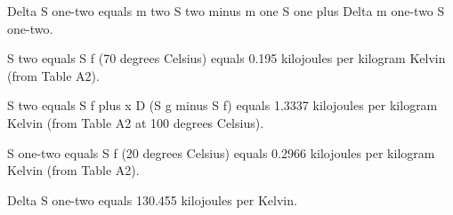 Delta S one-two equals m two S two minus m one S one plus Delta m one-two S one-two.  

S two equals S f (70 degrees Celsius) equals 0.195 kilojoules per kilogram Kelvin (from Table A2).  

S two equals S f plus x D (S g minus S f) equals 1.3337 kilojoules per kilogram Kelvin (from Table A2 at 100 degrees Celsius).  

S one-two equals S f (20 degrees Celsius) equals 0.2966 kilojoules per kilogram Kelvin (from Table A2).  

Delta S one-two equals 130.455 kilojoules per Kelvin.